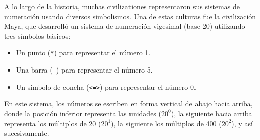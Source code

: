 
A lo largo de la historia, muchas civilizationes representaron sus sistemas de numeraci\'on usando diversos simbolismos. Una de estas culturas fue la civilización Maya, que desarrolló un sistema de numeración vigesimal (base-20) utilizando tres símbolos básicos:

\begin{itemize}
    \item Un punto (\texttt{*}) para representar el número 1.
    \item Una barra (\texttt{---}) para representar el número 5.
    \item Un símbolo de concha (\texttt{<=>}) para representar el número 0.
\end{itemize}

En este sistema, los números se escriben en forma vertical de abajo hacia arriba, donde la posición inferior representa las unidades ($20^0$), la siguiente hacia arriba representa los múltiplos de 20 ($20^1$), la siguiente los múltiplos de 400 ($20^2$), y así sucesivamente.

